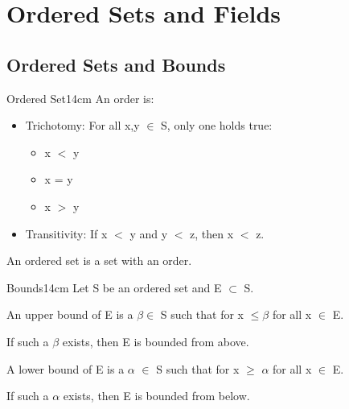 \newpage
\section[Day 1: Ordered Sets \& Fields]{ Ordered Sets and Fields }

\subsection{ Ordered Sets and Bounds }

	\begin{definition}{Ordered Set}{14cm}
		An order is:

		\begin{itemize}[leftmargin=1cm, itemsep=0.1cm]
			\item { \color{lblue} Trichotomy}:
				For all x,y $ \in $ S, only one holds true:

				\begin{itemize}[leftmargin=1cm, itemsep=0.1cm]
					\item x $<$ y
					\item x = y
					\item x $>$ y
				\end{itemize}

			\item { \color{lblue} Transitivity}:
				If x $<$ y and y $<$ z, then x $<$ z.
		\end{itemize}

		An ordered set is a set with an order.
	\end{definition}	

	\vspace{0.5cm}



	\begin{definition}{Bounds}{14cm}
		Let S be an ordered set and E $ \subset $ S.

		An upper bound of E is a $ \beta \in $ S such that for x $ \leq \beta $
		for all x $ \in $ E.

		\hspace{1cm}
		If such a $ \beta $ exists, then E is bounded from above.

		A lower bound of E is a $\alpha$ $\in$ S such that for x $ \geq $ $\alpha$
		for all x $\in$ E.

		\hspace{1cm}
		If such a $\alpha$ exists, then E is bounded from below.	
	\end{definition}

	\vspace{0.5cm}




